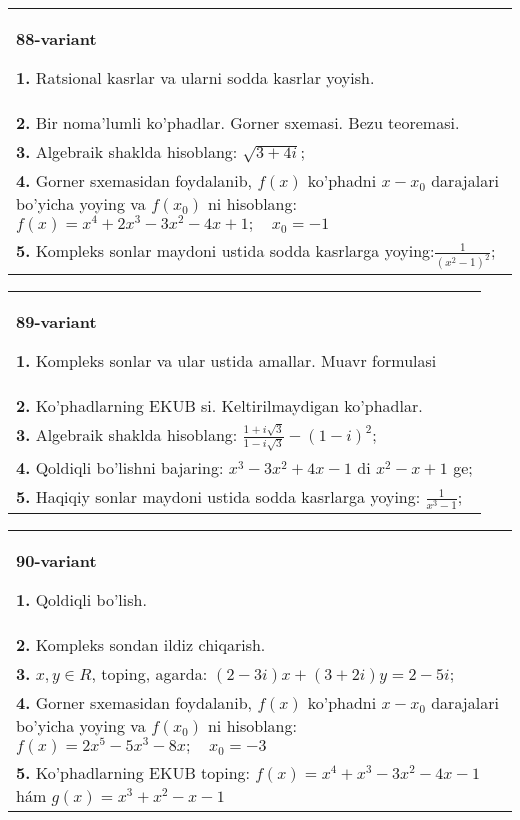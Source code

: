\documentclass{article}
\begin{document}
\begin{tabular}{m{17cm}}
\textbf{88-variant}
\newline

\textbf{1.} Ratsional kasrlar va ularni sodda kasrlar yoyish. \\
\textbf{2.} Bir noma’lumli ko’phadlar. Gorner sxemasi. Bezu teoremasi.  \\
\textbf{3.} Algebraik shaklda hisoblang:  $\sqrt{3+4 i}$; \\
\textbf{4.} Gorner sxemasidan foydalanib, $f(x)$ ko’phadni $x-x_0$ darajalari bo’yicha yoying va $f\left(x_0\right)$ ni hisoblang: $f(x)=x^4+2 x^3-3 x^2-4 x+1 ; \quad x_0=-1$ \\
\textbf{5.} Kompleks sonlar maydoni ustida sodda kasrlarga yoying:$\frac{1}{\left(x^2-1\right)^2}$; \\

\end{tabular}
\vspace{1cm}


\begin{tabular}{m{17cm}}
\textbf{89-variant}
\newline

\textbf{1.} Kompleks sonlar va ular ustida amallar. Muavr formulasi  \\
\textbf{2.} Ko’phadlarning EKUB si. Keltirilmaydigan ko’phadlar. \\
\textbf{3.} Algebraik shaklda hisoblang: $\frac{1+i \sqrt{3}}{1-i \sqrt{3}}-(1-i)^2$; \\
\textbf{4.} Qoldiqli bo’lishni bajaring:  $x^3-3 x^2+4 x-1$ di $x^2-x+1$ ge; \\
\textbf{5.} Haqiqiy sonlar maydoni ustida sodda kasrlarga yoying:  $\frac{1}{x^3-1}$; \\

\end{tabular}
\vspace{1cm}


\begin{tabular}{m{17cm}}
\textbf{90-variant}
\newline

\textbf{1.} Qoldiqli bo’lish.  \\
\textbf{2.} Kompleks sondan ildiz chiqarish. \\
\textbf{3.}  $x, y \in R$, toping, agarda: $(2-3 i) x+(3+2 i) y=2-5 i$; \\
\textbf{4.} Gorner sxemasidan foydalanib, $f(x)$ ko’phadni $x-x_0$ darajalari bo’yicha yoying va $f\left(x_0\right)$ ni hisoblang: $f(x)=2 x^5-5 x^3-8 x ; \quad x_0=-3$ \\
\textbf{5.} Ko’phadlarning EKUB toping:  $f(x)=x^4+x^3-3 x^2-4 x-1$ hám $g(x)=x^3+x^2-x-1$ \\

\end{tabular}
\vspace{1cm}
\end{document}
